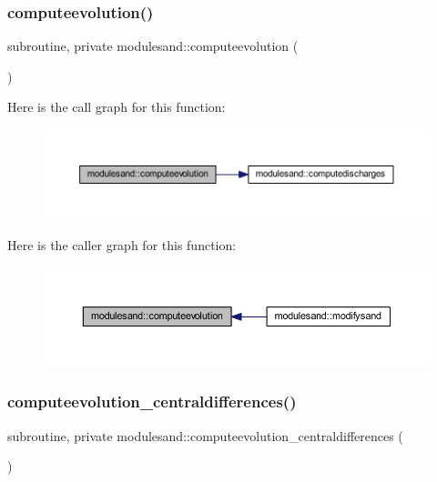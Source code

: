 \subsubsection{\texorpdfstring{computeevolution()}{computeevolution()}}
{\footnotesize\ttfamily subroutine, private modulesand\+::computeevolution (\begin{DoxyParamCaption}{ }\end{DoxyParamCaption})\hspace{0.3cm}{\ttfamily [private]}}

Here is the call graph for this function\+:\nopagebreak
\begin{figure}[H]
\begin{center}
\leavevmode
\includegraphics[width=350pt]{namespacemodulesand_ad15b8bd8644b2a7c104622be042c70be_cgraph}
\end{center}
\end{figure}
Here is the caller graph for this function\+:\nopagebreak
\begin{figure}[H]
\begin{center}
\leavevmode
\includegraphics[width=350pt]{namespacemodulesand_ad15b8bd8644b2a7c104622be042c70be_icgraph}
\end{center}
\end{figure}
\mbox{\label{namespacemodulesand_a0a0730547aa0d650a7bcc24395ba4cea}} 
\subsubsection{\texorpdfstring{computeevolution\+\_\+centraldifferences()}{computeevolution\_centraldifferences()}}
{\footnotesize\ttfamily subroutine, private modulesand\+::computeevolution\+\_\+centraldifferences (\begin{DoxyParamCaption}{ }\end{DoxyParamCaption})\hspace{0.3cm}{\ttfamily [private]}}

